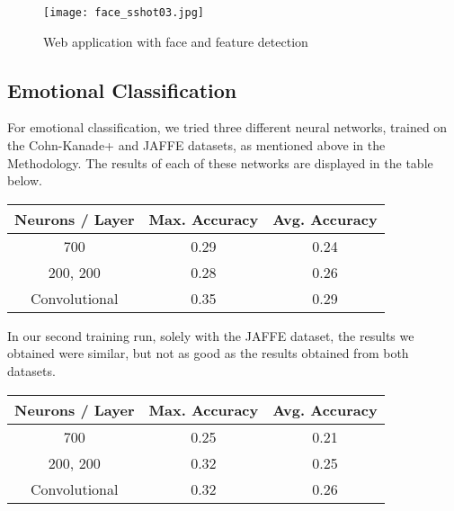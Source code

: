 \documentclass[10pt,twocolumn,letterpaper]{article}
\begin{document}
\begin{figure}
\centering
\texttt{[image: face\_sshot03.jpg]}
\caption{Web application with face and feature detection\label{fig:feature_sshot}}
\end{figure}

\subsection{Emotional Classification}

For emotional classification, we tried three different neural networks, trained on the Cohn-Kanade+ and JAFFE datasets, as mentioned above in the Methodology. The results of each of these networks are displayed in the table below. 

\vspace{\baselineskip}

\noindent
\begin{tabular*}{\linewidth}{ccc}
\hline \rule[-2ex]{0pt}{5.5ex} {\bf Neurons / Layer} & {\bf Max. Accuracy} & {\bf Avg. Accuracy} \\ 
\hline \rule[-2ex]{0pt}{5.5ex} 700 & 0.29 & 0.24 \\ 
\rule[-2ex]{0pt}{5.5ex} 200, 200 & 0.28 & 0.26 \\ 
\rule[-2ex]{0pt}{5.5ex} Convolutional & 0.35 & 0.29 \\ 
\hline 
\end{tabular*}

\vspace{\baselineskip}

In our second training run, solely with the JAFFE dataset, the results we obtained were similar, but not as good as the results obtained from both datasets.

\vspace{\baselineskip}

\noindent
\begin{tabular*}{\linewidth}{ccc}
\hline \rule[-2ex]{0pt}{5.5ex} {\bf Neurons / Layer} & {\bf Max. Accuracy} & {\bf Avg. Accuracy} \\ 
\hline \rule[-2ex]{0pt}{5.5ex} 700 & 0.25 & 0.21 \\ 
\rule[-2ex]{0pt}{5.5ex} 200, 200 & 0.32 & 0.25 \\ 
\rule[-2ex]{0pt}{5.5ex} Convolutional & 0.32 & 0.26 \\ 
\hline 
\end{tabular*}

\vspace{\baselineskip}
\end{document}
